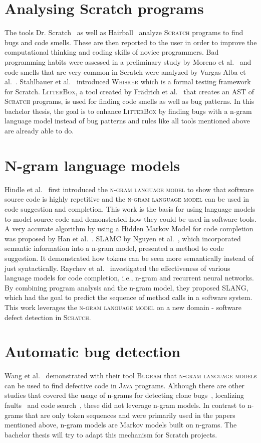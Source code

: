 \documentclass[
    numbers=noenddot,
    parskip=half-,
    fontsize=12pt,
    paper=a4,
    oneside,
    titlepage,
    bibliography=totoc,
    chapterprefix=false,
]{scrbook}
\newcommand{\ngram}{\textsc{n-gram language model}}
\newcommand{\bugram}{\textsc{Bugram}}
\newcommand{\litterbox}{\textsc{LitterBox}}
\newcommand{\scratch}{\textsc{Scratch}}
\newcommand{\java}{\textsc{Java}}
\newcommand{\whisker}{\textsc{Whisker}}
\begin{document}
    \section{Analysing Scratch programs}\label{sec:analyzing-scratch}
    The tools Dr. Scratch~\cite{drscratch} as well as Hairball~\cite{hairball} analyze \scratch{} programs to find bugs and code smells. These are then reported to the user in order to improve the computational thinking and coding skills of novice programmers. Bad programming habits were assessed in a preliminary study by Moreno et al.~\cite{badhabits} and code smells that are very common in Scratch were analyzed by Vargas-Alba et al.~\cite{badsmells}. Stahlbauer et al.~\cite{whisker} introduced \whisker{} which is a formal testing framework for Scratch. \litterbox, a tool created by Frädrich et al.~\cite{scratch_bugpatterns} that creates an AST of \scratch{} programs, is used for finding code smells as well as bug patterns. In this bachelor thesis, the goal is to enhance \litterbox{} by finding bugs with a n-gram language model instead of bug patterns and rules like all tools mentioned above are already able to do.
    

    \section{N-gram language models}\label{sec:language-models}
    Hindle et al.~\cite{naturalness} ﬁrst introduced the \ngram{} to show that software source code is highly repetitive and the \ngram{} can be used in code suggestion and completion. This work is the basis for using language models to model source code and demonstrated how they could be used in software tools. A very accurate algorithm by using a Hidden Markov Model for code completion was proposed by Han et al.~\cite{codecompletion}. SLAMC by Nguyen et al.~\cite{SLAMC}, which incorporated semantic information into a n-gram model, presented a method to code suggestion. It demonstrated how tokens can be seen more semantically instead of just syntactically. Raychev et al.~\cite{SLANG} investigated the eﬀectiveness of various language models for code completion, i.e., n-gram and recurrent neural networks. By combining program analysis and the n-gram model, they proposed SLANG, which had the goal to predict the sequence of method calls in a software system. This work leverages the \ngram{} on a new domain - software defect detection in \scratch{}.
    

    \section{Automatic bug detection}\label{sec:bugram}
    Wang et al.~\cite{bugram} demonstrated with their tool \bugram{} that \ngram{s} can be used to find defective code in \java{} programs. Although there are other studies that covered the usage of n-grams for detecting clone bugs~\cite{clonebugs}, localizing faults~\cite{faults} and code search~\cite{codesearch}, these did not leverage n-gram models. In contrast to n-grams that are only token sequences and were primarily used in the papers mentioned above, n-gram models are Markov models built on n-grams. The bachelor thesis will try to adapt this mechanism for Scratch projects.
\end{document}

